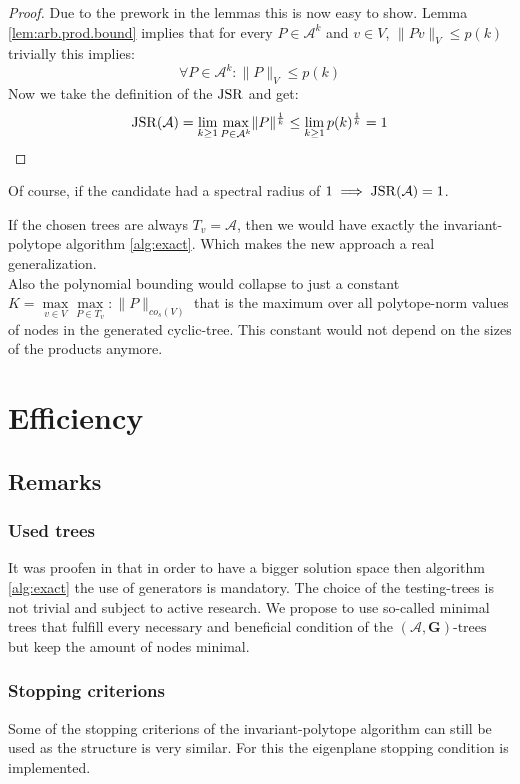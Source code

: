 \begin{proof}
  Due to the prework in the lemmas this is now easy to show. 
  Lemma \ref{lem:arb.prod.bound} implies that for every $P \in \mathcal{A}^k$ and $v \in V$, $\lVert Pv \rVert _V \le p(k)$
  trivially this implies: 
  $$
    \forall P \in \mathcal{A}^k: \lVert P \rVert _V \le p(k)
  $$
  Now we take the definition of the $\operatorname{JSR}$ and get:
  $$
    \operatorname{JSR}(\mathcal{A}) = \lim_{k \geq 1} \max_{P \in \mathcal{A}^k} \lVert P \rVert^\frac{1}{k} \le \lim_{k \geq 1} p(k)^\frac{1}{k} = 1
  $$ 
\end{proof}

Of course, if the candidate had a spectral radius of $1 \implies \operatorname{JSR}(\mathcal{A}) = 1$.

\begin{corollary}
  If the chosen trees are always $T_v = \mathcal{A}$, then we would have exactly the invariant-polytope algorithm \ref{alg:exact}. 
  Which makes the new approach a real generalization. \\
  Also the polynomial bounding would collapse to just a constant $ K = \max\limits_{v \in V}\max\limits_{P \in T_{v}}: \lVert P \rVert _{co_{s}(V)}$ that is the maximum over all polytope-norm values of nodes in the generated cyclic-tree. This constant would not depend on the sizes of the products anymore.
\end{corollary}

\section{Efficiency}

\subsection*{Remarks}
\subsubsection*{Used trees}
It was proofen in \citep{mollerTreebasedApproachJoint2014} that in order to have a bigger solution space then algorithm \ref{alg:exact} the use of generators is mandatory. 
The choice of the testing-trees is not trivial and subject to active research. 
We propose to use so-called minimal trees that fulfill every necessary and beneficial condition of the $(\mathcal{A},\mathbf{G})\text{-trees}$ but keep the amount of nodes minimal.

\subsubsection*{Stopping criterions}
Some of the stopping criterions of the invariant-polytope algorithm can still be used as the structure is very similar. 
For this the eigenplane stopping condition is implemented. 

